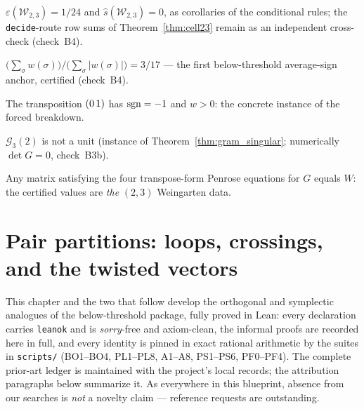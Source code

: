 \begin{corollary}\label{cor:cell_rules}
\leanok
{}
$\varepsilon(\mathcal W_{2,3})=1/24$ and $\hat s(\mathcal W_{2,3})=0$, as
corollaries of the conditional rules; the \texttt{decide}-route row sums
of Theorem~\ref{thm:cell23} remain as an independent cross-check
(check~B4).
\end{corollary}

\begin{proposition}\label{prop:avg_sign}
\leanok
{}
$\bigl(\sum_\sigma w(\sigma)\bigr)/\bigl(\sum_\sigma|w(\sigma)|\bigr)
=3/17$ --- the first below-threshold average-sign anchor,
certified (check~B4).
\end{proposition}

\begin{proposition}\label{prop:sign_flip}
\leanok
{}
The transposition $(0\,1)$ has $\operatorname{sgn}=-1$ and $w>0$: the concrete
instance of the forced breakdown.
\end{proposition}

\begin{corollary}\label{cor:gram_two_singular}
\leanok
{}
$\mathcal G_3(2)$ is not a unit (instance of
Theorem~\ref{thm:gram_singular}; numerically $\det G=0$, check~B3b).
\end{corollary}

\begin{corollary}\label{cor:cell_unique}
\leanok
{}
Any matrix satisfying the four transpose-form Penrose equations for $G$
equals $W$: the certified values are \emph{the} $(2,3)$ Weingarten data.
\end{corollary}

\chapter{Pair partitions: loops, crossings, and the twisted vectors}\label{ch:pairings}

This chapter and the two that follow develop the orthogonal and symplectic
analogues of the below-threshold package, fully proved in Lean: every
declaration carries \texttt{leanok} and is \emph{sorry}-free and axiom-clean, the
informal proofs are recorded here in full, and every
identity is pinned in exact rational arithmetic by the suites in
\texttt{scripts/} (BO1--BO4, PL1--PL8, A1--A8, PS1--PS6, PF0--PF4). The
complete prior-art ledger is maintained with the project's local
records; the attribution paragraphs below summarize it.
As everywhere in this blueprint, absence from our searches is \emph{not} a
novelty claim --- reference requests are outstanding.

